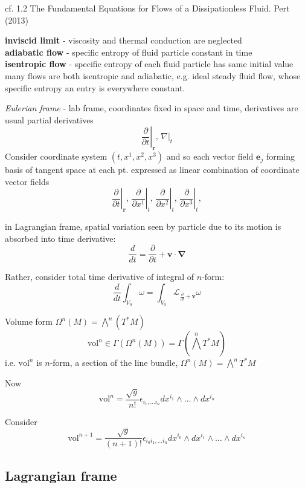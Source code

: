 cf. 1.2 The Fundamental Equations for Flows of a Dissipationless Fluid. Pert (2013) \cite{dgdt:Pert2013}

\textbf{inviscid limit} - viscosity and thermal conduction are neglected \\
\textbf{adiabatic flow} - specific entropy of fluid particle constant in time \\
\textbf{isentropic flow} - specific entropy of each fluid particle has same initial value \\

many flows are both isentropic and adiabatic, e.g. ideal steady fluid flow, whose specific entropy an entry is everywhere constant.

\emph{Eulerian frame} - lab frame, coordinates fixed in space and time, derivatives are usual partial derivatives
\[
\left. \frac{ \partial }{ \partial t} \right|_{\mathbf{r}}, \, \left. \nabla \right|_t
\]
Consider coordinate system $(t, x^1, x^2, x^3)$ and so each vector field $\mathbf{e}_j$ forming basis of tangent space at each pt. expressed as linear combination of coordinate vector fields
\[
\left. \frac{\partial}{\partial t} \right|_{\mathbf{r}}, \, \left. \frac{\partial}{\partial x^1} \right|_{t}, \, \left. \frac{\partial}{\partial x^2} \right|_{t}, \, \left. \frac{\partial}{\partial x^3} \right|_{t},
\]

in Lagrangian frame, spatial variation seen by particle due to its motion is absorbed into time derivative:
\[
\frac{d}{dt} = \frac{\partial }{ \partial t} + \mathbf{v} \cdot \mathbf{\nabla} 
\]

Rather, consider total time derivative of integral of $n$-form: 
\[
\frac{d}{dt} \int_{V_0} \omega = \int_{V_0} \mathcal{L}_{\frac{\partial}{\partial t} + \mathbf{v} } \omega 
\]

Volume form $\Omega^n(M) = \bigwedge^n (T^*M)$
\[
\text{vol}^n \in \Gamma(\Omega^n(M)) = \Gamma(\bigwedge^n T^*M)
\]
i.e. $\text{vol}^n$ is $n$-form, a section of the line bundle, $\Omega^n(M) = \bigwedge^n T^*M$

Now
\[
\text{vol}^n = \frac{\sqrt{g}}{ n!} \epsilon_{i_1, \dots i_n} dx^{i_1} \wedge \dots \wedge dx^{i_n}
\]

Consider 
\[
\text{vol}^{n+1} = \frac{\sqrt{g}}{ (n+1)!} \epsilon_{i_0 i_1, \dots i_n} dx^{i_0} \wedge dx^{i_1} \wedge \dots \wedge dx^{i_n}
\]

\subsection{Lagrangian frame}

